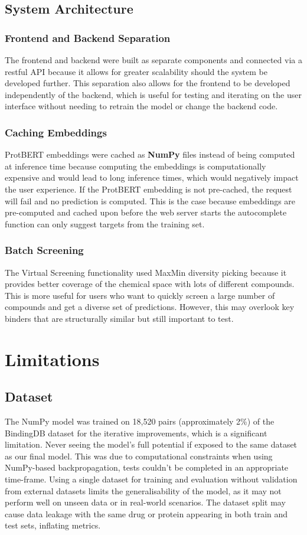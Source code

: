 \subsection{System Architecture}
\subsubsection{Frontend and Backend Separation}
The frontend and backend were built as separate components and connected via a restful API because it allows for greater scalability should the system be developed further.
This separation also allows for the frontend to be developed independently of the backend, which is useful for testing and iterating on the user interface without needing to retrain the model or change the backend code.
\subsubsection{Caching Embeddings}
ProtBERT embeddings were cached as \textbf{NumPy} files instead of being computed at inference time because computing the embeddings is computationally expensive and would lead to long inference times, which would negatively impact the user experience.
If the ProtBERT embedding is not pre-cached, the request will fail and no prediction is computed.
This is the case because embeddings are pre-computed and cached upon before the web server starts the autocomplete function can only suggest targets from the training set.
\subsubsection{Batch Screening}
The Virtual Screening functionality used MaxMin diversity picking because it provides better coverage of the chemical space with lots of different compounds.
This is more useful for users who want to quickly screen a large number of compounds and get a diverse set of predictions.
However, this may overlook key binders that are structurally similar but still important to test.

\section{Limitations}
\subsection{Dataset}
The NumPy model was trained on 18,520 pairs (approximately 2\%) of the BindingDB dataset for the iterative improvements, which is a significant limitation.
Never seeing the model's full potential if exposed to the same dataset as our final model.
This was due to computational constraints when using NumPy-based backpropagation, tests couldn't be completed in an appropriate time-frame.
Using a single dataset for training and evaluation without validation from external datasets limits the generalisability of the model, as it may not perform well on unseen data or in real-world scenarios.
The dataset split may cause data leakage with the same drug or protein appearing in both train and test sets, inflating metrics.
